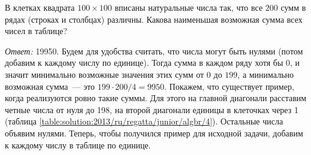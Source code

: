 \problem
В клетках квадрата $100 \times 100$ вписаны натуральные числа так, что все
$200$ сумм в рядах (строках и столбцах) различны.
Какова наименьшая возможная сумма всех чисел в таблице?

%
\global\let\ifdiagonalsolutiondefined\iftrue
\label{solution:2013/ru/regatta/junior/algbr/4}%
\emph{Ответ:} 19950.
Будем для удобства считать, что числа могут быть нулями
(потом добавим к каждому числу по единице).
Тогда сумма в каждом ряду хотя бы 0, и значит минимально возможные значения
этих сумм от 0 до $199$, а минимально возможная сумма~--- это
$199 \cdot 200 / 4 = 9950$.
Покажем, что существует пример, когда реализуются ровно такие суммы.
Для этого на главной диагонали расставим четные числа от нуля до 198, на второй
диагонали единицы в клеточках через 1
(таблица \ref{table:solution:2013/ru/regatta/junior/algbr/4}).
Остальные числа объявим нулями.
Теперь, чтобы получился пример для исходной задачи, добавим к каждому числу в
таблице по единице.
\endproblem
